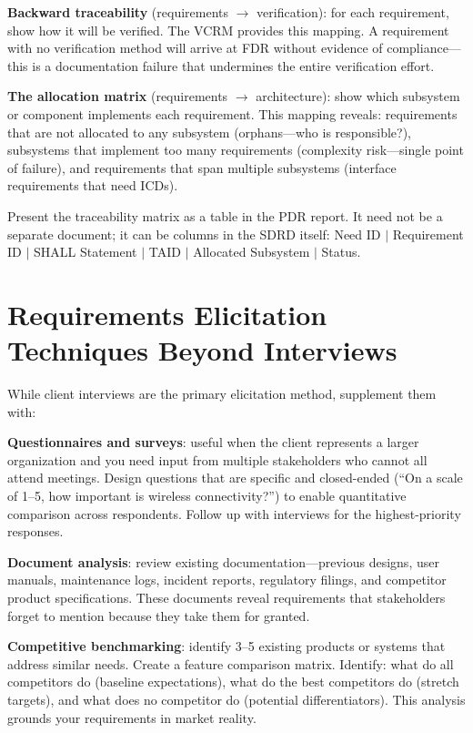 \textbf{Backward traceability} (requirements $\to$ verification): for each requirement, show how it will be verified. The VCRM provides this mapping. A requirement with no verification method will arrive at FDR without evidence of compliance---this is a documentation failure that undermines the entire verification effort.

\textbf{The allocation matrix} (requirements $\to$ architecture): show which subsystem or component implements each requirement. This mapping reveals: requirements that are not allocated to any subsystem (orphans---who is responsible?), subsystems that implement too many requirements (complexity risk---single point of failure), and requirements that span multiple subsystems (interface requirements that need ICDs).

Present the traceability matrix as a table in the PDR report. It need not be a separate document; it can be columns in the SDRD itself: Need ID $|$ Requirement ID $|$ SHALL Statement $|$ TAID $|$ Allocated Subsystem $|$ Status.



\section{Requirements Elicitation Techniques Beyond Interviews}
While client interviews are the primary elicitation method, supplement them with:

\textbf{Questionnaires and surveys}: useful when the client represents a larger organization and you need input from multiple stakeholders who cannot all attend meetings. Design questions that are specific and closed-ended (``On a scale of 1--5, how important is wireless connectivity?'') to enable quantitative comparison across respondents. Follow up with interviews for the highest-priority responses.

\textbf{Document analysis}: review existing documentation---previous designs, user manuals, maintenance logs, incident reports, regulatory filings, and competitor product specifications. These documents reveal requirements that stakeholders forget to mention because they take them for granted.

\textbf{Competitive benchmarking}: identify 3--5 existing products or systems that address similar needs. Create a feature comparison matrix. Identify: what do all competitors do (baseline expectations), what do the best competitors do (stretch targets), and what does no competitor do (potential differentiators). This analysis grounds your requirements in market reality.

